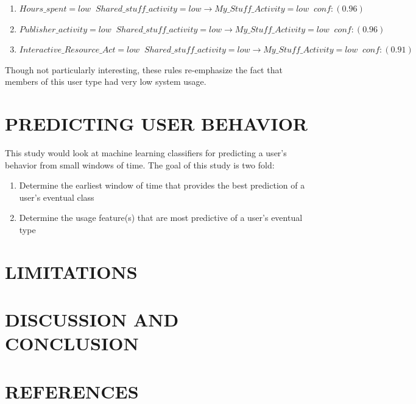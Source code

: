 \documentclass{acm_proc_article-sp}
\begin{document}
\begin{enumerate}

\item $Hours\_spent=low \;\; Shared\_stuff\_activity =low  \longrightarrow My\_Stuff\_Activity =low  \;\;    conf:(0.96)$
\item $Publisher\_activity=low \;\; Shared\_stuff\_activity=low  \longrightarrow My\_Stuff\_Activity = low  \;\;  conf:(0.96)$
\item $Interactive\_Resource\_Act=low  \;\;Shared\_stuff\_activity=low  \longrightarrow My\_Stuff\_Activity=low  \;\; conf:(0.91)$
\end{enumerate}
Though not particularly interesting, these rules re-emphasize the fact that members of this user type had very low system usage.

 \section {PREDICTING USER BEHAVIOR}
This study would look at machine learning classifiers for predicting a user's behavior from small windows of time. The goal of this study is two fold:
\begin{enumerate}
\item Determine the earliest window of time that provides the best prediction of a user's eventual class
\item Determine the usage feature(s) that are most predictive of a user's eventual type

\end{enumerate}
\section{LIMITATIONS}

\section{DISCUSSION AND CONCLUSION}

\section{REFERENCES}

  
\end{document}
